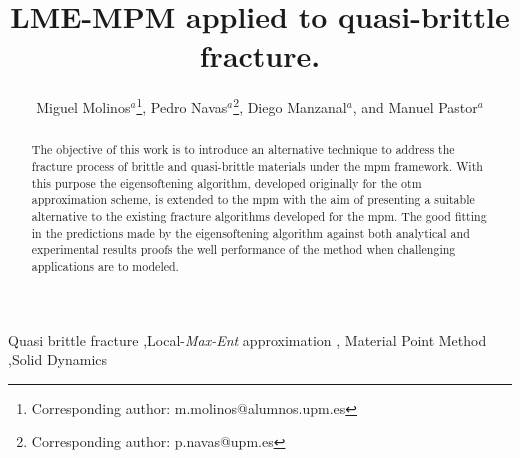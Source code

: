 \documentclass[preprint,12pt,a4paper]{elsarticle}
\begin{document}
\begin{frontmatter}

\title{LME-MPM applied to quasi-brittle fracture.}


\author{
Miguel Molinos$^a$\footnote{Corresponding author: m.molinos@alumnos.upm.es},
Pedro Navas$^a$\footnote{Corresponding author: p.navas@upm.es},
Diego Manzanal$^a$,
and Manuel Pastor$^a$
 }
 \address{
 $^a$ ETSI Caminos, Canales y Puertos, Universidad Polit\'ectnica de Madrid.\\
 c. Prof. Aranguren 3, 28040 Madrid, Spain
}

\begin{abstract}
  The objective of this work is to introduce an alternative
  technique to address the fracture process of brittle and
  quasi-brittle materials under the \acrfull{mpm} 
  framework. With this purpose the eigensoftening algorithm, developed
  originally for the \acrfull{otm} approximation scheme, is extended
  to the \acrshort{mpm} with the aim of presenting a suitable alternative
  to the existing fracture algorithms developed for the
  \acrshort{mpm}. The good fitting in the predictions made by the
  eigensoftening algorithm against both analytical and experimental
  results proofs the well performance of the method when challenging
  applications are to modeled.
\end{abstract}

\begin{keyword}
Quasi brittle fracture \sep Local-\textit{Max-Ent} approximation \sep
Material Point Method \sep Solid Dynamics
\end{keyword}

\end{frontmatter}

\linenumbers

\end{document}
